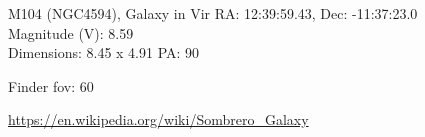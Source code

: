 \begin{block}{M104 (NGC4594), Galaxy in Vir}
    RA: 12:39:59.43, Dec: -11:37:23.0 \\ 
    Magnitude (V): 8.59 \\ 
    Dimensions: 8.45 x 4.91 PA: 90 

    Finder fov: 60 

    \url{https://en.wikipedia.org/wiki/Sombrero_Galaxy} 
\end{block}